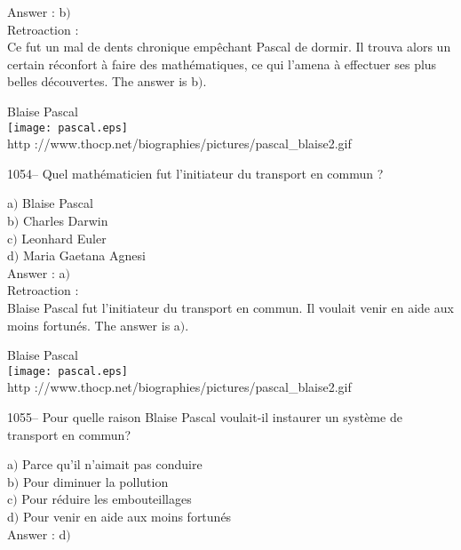﻿\documentclass[letterpaper, 12pt]{article}
\begin{document}
Answer : b$)$\\

Retroaction : \\
Ce fut un mal de dents chronique emp\^echant Pascal de dormir. Il
trouva alors un certain r\'econfort \`a faire des math\'ematiques,
ce qui l'amena \`a effectuer ses plus belles d\'ecouvertes.
The answer is b$)$.\\

        \begin{center}
        Blaise Pascal\\
    \texttt{[image: pascal.eps]}\\
        {\footnotesize http
://www.thocp.net/biographies/pictures/pascal\_blaise2.gif}
    \end{center}

1054-- Quel math\'ematicien fut l'initiateur du transport en commun
?

a$)$ Blaise Pascal \\
b$)$ Charles Darwin  \\
c$)$ Leonhard Euler  \\
d$)$ Maria Gaetana Agnesi\\

Answer : a$)$\\

Retroaction : \\
Blaise Pascal fut l'initiateur du transport en commun. Il voulait
venir en aide aux moins fortun\'es.
The answer is a$)$.\\

        \begin{center}
        Blaise Pascal\\
    \texttt{[image: pascal.eps]}\\
        {\footnotesize http
://www.thocp.net/biographies/pictures/pascal\_blaise2.gif}
    \end{center}

1055-- Pour quelle raison Blaise Pascal voulait-il instaurer un
syst\`eme de transport en commun?

a$)$ Parce qu'il n'aimait pas conduire \\
b$)$ Pour diminuer la pollution \\
c$)$ Pour r\'eduire les embouteillages  \\
d$)$ Pour venir en aide aux moins fortun\'es \\

Answer : d$)$\\
\end{document}
